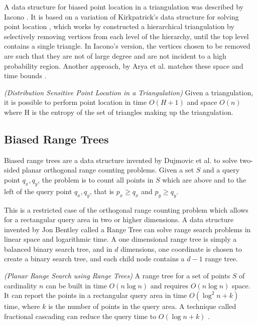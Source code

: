 \documentclass[mcs]{scsthesis}
\begin{document}
A data structure for biased point location in a triangulation was described
by Iacono \cite{iacono}. It is based on a variation of Kirkpatrick's data
structure for solving point location \cite{kirkpatrick}, which works by
constructed a hierarchical triangulation by selectively removing vertices
from each level of the hierarchy, until the top level contains a single triangle.
In Iacono's version, the vertices chosen to be removed are such that they are
not of large degree and are not incident to a high probability region. Another
approach, by Arya et al. matches these space and time bounds \cite{simpleentropy}.

\begin{thm} \emph{(Distribution Sensitive Point Location in a Triangulation)} 
Given a triangulation, it is possible to perform point location in time
\(O(H + 1)\) and space \(O(n)\) where H is the entropy of the set of triangles
making up the triangulation. 
\end{thm}

\subsection{Biased Range Trees}

Biased range trees are a data structure invented by Dujmovic et al.
\cite{biasedrange} to solve two-sided planar orthogonal range counting problems.
Given a set \(S\) and a query point \(q_x, q_y\), the problem is to count all
points in \(S\) which are above and to the left of the query point
\(q_x, q_y\), that is \(p_x \ge q_x\) and \(p_y \ge q_y\).

This is a restricted case of the orthogonal range counting problem which allows
for a rectangular query area in two or higher dimensions. A data structure
invented by Jon Bentley \cite{rangetree} called a Range Tree can solve range
search problems in linear space and logarithmic time. A one dimensional range
tree is simply a balanced binary search tree, and in \(d\) dimensions, one
coordinate is chosen to create a binary search tree, and each child node
contains a \(d - 1\) range tree. 

\begin{thm} \emph{(Planar Range Search using Range Trees)} 
A range tree for a set of points \(S\) of cardinality \(n\) can be built in
time \(O(n \log n)\) and requires \(O(n \log n)\) space. It can report the
points in a rectangular query area in time \(O(\log^2 n + k)\) time, where
\(k\) is the number of points in the query area. A technique called
fractional cascading can reduce the query time to \(O(\log n + k)\)
\cite{dutch}. 
\end{thm}
\end{document}

